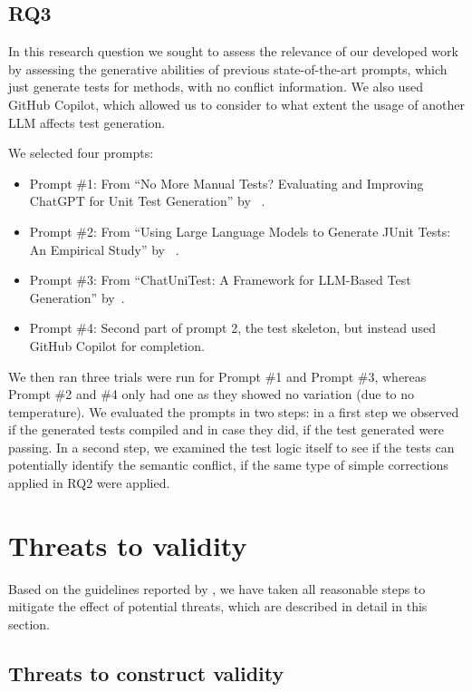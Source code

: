 \subsection{RQ3}

In this research question we sought to assess the relevance of our developed work by assessing the generative abilities of previous state-of-the-art prompts, which just generate tests for methods, with no conflict information.
We also used GitHub Copilot, which allowed us to consider to what extent the usage of another LLM affects test generation.

We selected four prompts:
\begin{itemize}
  \item Prompt \#1: From ``No More Manual Tests? Evaluating and Improving ChatGPT for Unit Test Generation'' by ~\citet{kn:chattester}.
  \item Prompt \#2: From ``Using Large Language Models to Generate JUnit Tests: An Empirical Study'' by ~\citet{kn:siddiq2023empirical}.
  \item Prompt \#3: From ``ChatUniTest: A Framework for LLM-Based Test Generation'' by~\citet{kn:chatunitest}.
  \item Prompt \#4: Second part of prompt 2, the test skeleton, but instead used GitHub Copilot for completion.
\end{itemize}
%
We then ran three trials were run for Prompt \#1 and Prompt \#3, whereas Prompt \#2 and \#4 only had one as they showed no variation (due to no temperature).
We evaluated the prompts in two steps: in a first step we observed if the generated tests compiled and in case they did, if the test generated were passing.
In a second step, we examined the test logic itself to see if the tests can potentially identify the semantic conflict, if the same type of simple corrections applied in RQ2 were applied.

\section{Threats to validity}

Based on the guidelines reported by \citet{wohlin2012experimentation}, we have
taken all reasonable steps to mitigate the effect of potential threats, which
are described in detail in this section.

\subsection{Threats to construct validity}

